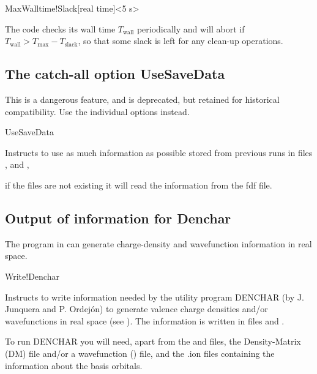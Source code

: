 \begin{fdfentry}{MaxWalltime!Slack}[real time]<5 s>

  The code checks its wall time $T_{\mathrm{wall}}$ periodically and will
  abort if $T_{\mathrm{wall}} > T_{\mathrm{max}} - T_{\mathrm{slack}}$, so that
  some slack is left for any clean-up operations.

\end{fdfentry}


\subsection{The catch-all option UseSaveData}

This is a dangerous feature, and is deprecated, but retained for
historical compatibility. Use the individual options instead.


\begin{fdflogicalF}{UseSaveData}

  Instructs to use as much information as possible stored from
  previous runs in files ,  and ,

  \note if the files are not existing it will read the information
  from the fdf file.

\end{fdflogicalF}



\subsection{Output of information for Denchar}

The program  in  can generate
charge-density and wavefunction information in real space.

\begin{fdflogicalF}{Write!Denchar}

  Instructs to write information needed by the utility program DENCHAR
  (by J. Junquera and P. Ordej\'on) to generate valence charge
  densities and/or wavefunctions in real space (see
  ). The information is written in files
   and .

  To run DENCHAR you will need, apart from the  and  files,
  the Density-Matrix (DM) file and/or a wavefunction ()
  file, and the .ion files containing the information about the basis
  orbitals.

\end{fdflogicalF}


